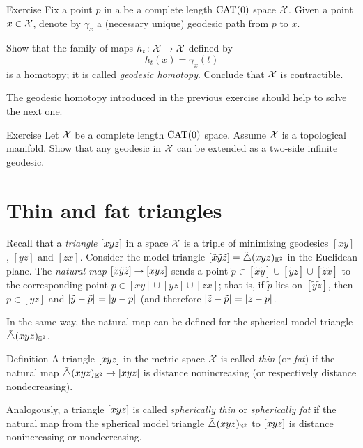 \begin{thm}{Exercise}\label{ex:contractible}
Fix a point $p$ in a  be a complete length $\mathrm{CAT}(0)$ space $\mathcal{X}$.
Given a point $x\in \mathcal{X}$, denote by $\gamma_x$ a (necessary unique) geodesic path from $p$ to $x$.

Show that the family of maps $h_t\colon \mathcal{X}\to \mathcal{X}$ defined by 
\[h_t(x)= \gamma_x(t)\]
is a homotopy; it is called \emph{geodesic homotopy}. 
Conclude that $\mathcal{X}$ is contractible.
\end{thm}

The geodesic homotopy introduced in the previous exercise should help to solve the next one.

\begin{thm}{Exercise}\label{ex:CAT-mnfld=>ext.geod}
Let $\mathcal{X}$ be a complete length $\mathrm{CAT}(0)$ space.
Assume $\mathcal{X}$ is a topological manifold.
Show that any geodesic in $\mathcal{X}$ can be extended 
as a two-side infinite geodesic.
\end{thm}
 

\section{Thin and fat triangles}

Recall that a \emph{triangle} $[xyz]$ in a space $\mathcal{X}$ 
is a triple of minimizing geodesics $[xy]$, $[yz]$ and $[zx]$.
Consider the  model triangle $[\tilde x\tilde y\tilde z]=\tilde\triangle{}({x}{y}{z})_{\mathbb{E}^2}$ in the Euclidean plane.
The \emph{natural map} $[\tilde x\tilde y\tilde z]\to [xyz]$ 
sends a point $\tilde p\in[\tilde x\tilde y]\cup[\tilde y\tilde z]\cup[\tilde z\tilde x]$ to the corresponding point $p\in[ x y]\cup[y z]\cup[ z x]$;
that is, if $\tilde p$ lies on $[\tilde y\tilde z]$,
then $p\in [y z]$ and $\dist{\tilde y}{\tilde p}{}=\dist{y}{p}{}$ (and therefore $\dist{\tilde z}{\tilde p}{}=\dist{z}{p}{}$.

In the same way, the natural map can be defined for the spherical model triangle $\tilde\triangle{}({x}{y}{z})_{\mathbb{S}^2}$.
 
\begin{thm}{Definition}\label{def:k-thin}
A triangle $[xyz]$ in the metric space $\mathcal{X}$ 
is called \emph{thin} (or \emph{fat}) if the natural map $\tilde\triangle{}({x}{y}{z})_{\mathbb{E}^2}\to [xyz]$ is distance nonincreasing (or respectively distance nondecreasing).

Analogously, a triangle $[xyz]$ 
is called \emph{spherically thin} or \emph{spherically fat} if
the natural map from the spherical model triangle $\tilde\triangle{}({x}{y}{z})_{\mathbb{S}^2}$ to $[xyz]$ is distance nonincreasing or nondecreasing.
\end{thm}

